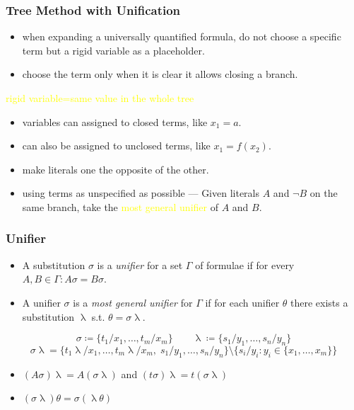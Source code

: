 \documentclass[UTF8,aspectratio=43,11pt,colorlinks,compress,openany]{beamer}%
\begin{document}
\begin{frame}\frametitle{Tree Method with Unification}
	\begin{itemize}
		\item when expanding a universally quantified formula, do not choose a specific term but a rigid variable as a placeholder.
		\item choose the term only when it is clear it allows closing a branch.
	\end{itemize}
	\begin{center}
		\textcolor{yellow}{rigid variable=same value in the whole tree}
	\end{center}
	\begin{itemize}
		\item variables can assigned to closed terms, like $x_1=a$.
		\item can also be assigned to unclosed terms, like $x_1=f(x_2)$.
	\end{itemize}
	\begin{itemize}
		\item make literals one the opposite of the other.
		\item using terms as unspecified as possible --- Given literals $A$ and $\neg B$ on the same branch, take the \textcolor{yellow}{most general unifier} of $A$ and $B$.
	\end{itemize}
\end{frame}

\begin{frame}\frametitle{Unifier}
\begin{block}{}
\begin{itemize}
\item A substitution $\sigma$ is a \emph{unifier} for a set $\Gamma$ of formulae if for every $A, B\in\Gamma: A\sigma=B\sigma$.
\item A unifier $\sigma$ is a \emph{most general unifier} for $\Gamma$ if for each unifier $\theta$ there exists a substitution $\uplambda$ s.t. $\theta=\sigma\uplambda$.
\end{itemize}
\end{block}
\[\sigma\coloneqq \{t_1/x_1,\dots,t_m/x_m\}\qquad \uplambda\coloneqq \{s_1/y_1,\dots,s_n/y_n\}\]
\[\sigma\uplambda=\big\{t_1\uplambda/x_1,\dots,t_m\uplambda/x_m,\; s_1/y_1,\dots,s_n/y_n\big\}\setminus\big\{s_i/y_i: y_i\in\{x_1,\dots,x_m\}\big\}\]
\begin{itemize}
	\item $(A\sigma)\uplambda=A(\sigma\uplambda)$ and $(t\sigma)\uplambda=t(\sigma\uplambda)$
	\item $(\sigma\uplambda)\theta=\sigma(\uplambda\theta)$
\end{itemize}
\end{frame}
\end{document}
